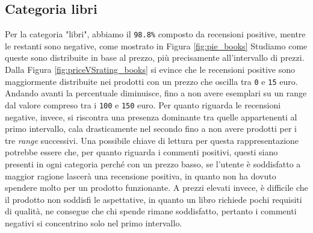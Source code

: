 		\subsection{Categoria libri}
			Per la categoria "libri", abbiamo il \verb|98.8%| composto da recensioni positive, mentre le restanti sono negative, come mostrato in Figura \ref{fig:pie_books}
			Studiamo come queste sono distribuite in base al prezzo, più precisamente all'intervallo di prezzi. \\
			Dalla Figura \ref{fig:priceVSrating_books} si evince che le recensioni positive sono maggiormente distribuite nei prodotti con un prezzo che oscilla tra \verb|0| e \verb|15| euro. Andando avanti la percentuale diminuisce, fino a non avere esemplari su un range dal valore compreso tra i \verb|100| e \verb|150| euro. Per quanto riguarda le recensioni negative, invece, si riscontra una presenza dominante tra quelle appartenenti al primo intervallo, cala drasticamente nel secondo fino a non avere prodotti per i tre \textit{range} successivi. Una possibile chiave di lettura per questa rappresentazione potrebbe essere che, per quanto riguarda i commenti positivi, questi siano presenti in ogni categoria perché con un prezzo basso, se l'utente è soddisfatto a maggior ragione lascerà una recensione positiva, in quanto non ha dovuto spendere molto per un prodotto funzionante. A prezzi elevati invece, è difficile che il prodotto non soddisfi le aspettative, in quanto un libro richiede pochi requisiti di qualità, ne consegue che chi spende rimane soddisfatto, pertanto i commenti negativi si concentrino solo nel primo intervallo.
				
